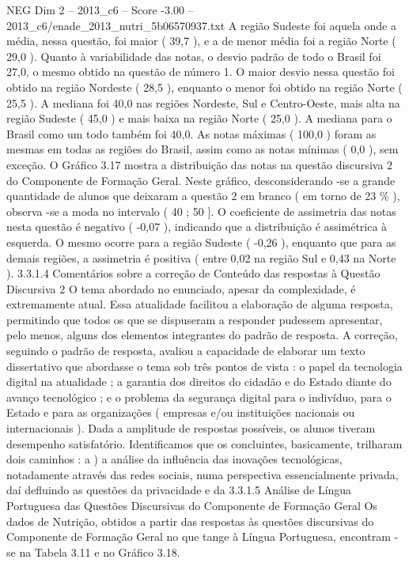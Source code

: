 \begin{textsample}{NEG Dim 2 – 2013\_c6 – Score -3.00 – 2013\_c6/enade\_2013\_nutri\_5b06570937.txt}
A região Sudeste foi aquela onde a média, nessa questão, foi maior ( 39,7 ), e a de menor média foi a região Norte ( 29,0 ).
Quanto à variabilidade das notas, o desvio padrão de todo o Brasil foi 27,0, o mesmo obtido na questão de número 1.
O maior desvio nessa questão foi obtido na região Nordeste ( 28,5 ), enquanto o menor foi obtido na região Norte ( 25,5 ).
A mediana foi 40,0 nas regiões Nordeste, Sul e Centro-Oeste, mais alta na região Sudeste ( 45,0 ) e mais baixa na região Norte ( 25,0 ).
A mediana para o Brasil como um todo também foi 40,0.
As notas máximas ( 100,0 ) foram as mesmas em todas as regiões do Brasil, assim como as notas mínimas ( 0,0 ), sem exceção.
O Gráfico 3.17 mostra a distribuição das notas na questão discursiva 2 do Componente de Formação Geral.
Neste gráfico, desconsiderando -se a grande quantidade de alunos que deixaram a questão 2 em branco ( em torno de 23 \% ), observa -se a moda no intervalo ( 40 ; 50 ].
O coeficiente de assimetria das notas nesta questão é negativo ( -0,07 ), indicando que a distribuição é assimétrica à esquerda.
O mesmo ocorre para a região Sudeste ( -0,26 ), enquanto que para as demais regiões, a assimetria é positiva ( entre 0,02 na região Sul e 0,43 na Norte ). 3.3.1.4 Comentários sobre a correção de Conteúdo das respostas à Questão Discursiva 2 O tema abordado no enunciado, apesar da complexidade, é extremamente atual.
Essa atualidade facilitou a elaboração de alguma resposta, permitindo que todos os que se dispuseram a responder pudessem apresentar, pelo menos, alguns dos elementos integrantes do padrão de resposta.
A correção, seguindo o padrão de resposta, avaliou a capacidade de elaborar um texto dissertativo que abordasse o tema sob três pontos de vista : o papel da tecnologia digital na atualidade ; a garantia dos direitos do cidadão e do Estado diante do avanço tecnológico ; e o problema da segurança digital para o indivíduo, para o Estado e para as organizações ( empresas e/ou instituições nacionais ou internacionais ).
Dada a amplitude de respostas possíveis, os alunos tiveram desempenho satisfatório.
Identificamos que os concluintes, basicamente, trilharam dois caminhos : a ) a análise da influência das inovações tecnológicas, notadamente através das redes sociais, numa perspectiva essencialmente privada, daí defluindo as questões da privacidade e da 3.3.1.5 Análise de Língua Portuguesa das Questões Discursivas do Componente de Formação Geral Os dados de Nutrição, obtidos a partir das respostas às questões discursivas do Componente de Formação Geral no que tange à Língua Portuguesa, encontram -se na Tabela 3.11 e no Gráfico 3.18.

\end{textsample}
